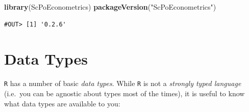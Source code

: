 \documentclass[]{book}
\newenvironment{Shaded}{\begin{snugshade}}{\end{snugshade}}
\newcommand{\KeywordTok}[1]{\textcolor[rgb]{0.13,0.29,0.53}{\textbf{#1}}}
\newcommand{\NormalTok}[1]{#1}
\newcommand{\StringTok}[1]{\textcolor[rgb]{0.31,0.60,0.02}{#1}}
\begin{document}
\begin{Shaded}
\begin{Highlighting}[]
\KeywordTok{library}\NormalTok{(ScPoEconometrics)}
\KeywordTok{packageVersion}\NormalTok{(}\StringTok{"ScPoEconometrics"}\NormalTok{)}
\end{Highlighting}
\end{Shaded}

\begin{verbatim}
#OUT> [1] '0.2.6'
\end{verbatim}

\hypertarget{data-types}{%
\section{Data Types}\label{data-types}}

\texttt{R} has a number of basic \emph{data types}. While \texttt{R} is not a \emph{strongly typed language} (i.e.~you can be agnostic about types most of the times), it is useful to know what data types are available to you:
\end{document}
